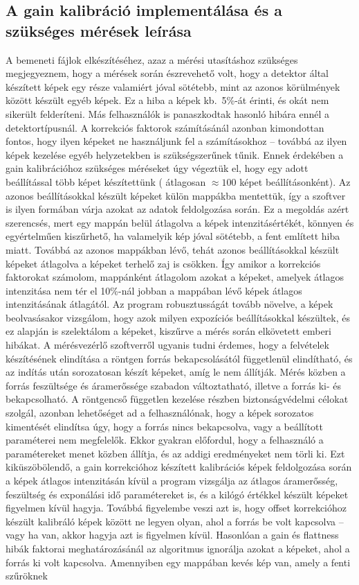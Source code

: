 \documentclass[a4paper,12pt]{article}
\begin{document}
 
\subsection{A gain kalibráció implementálása és a szükséges mérések leírása} 
\label{sec:reduce}
 
 
A bemeneti fájlok elkészítéséhez, azaz a mérési utasításhoz szükséges megjegyeznem, hogy a mérések során észrevehető volt, hogy a detektor által készített képek egy része valamiért jóval sötétebb, mint az azonos körülmények között készült egyéb képek. Ez a hiba a képek kb.\ 5\%-át érinti, és okát nem sikerült felderíteni. Más felhasználók is panaszkodtak hasonló hibára ennél a detektortípusnál. A korrekciós faktorok számításánál azonban kimondottan fontos, hogy ilyen képeket ne használjunk fel a számításokhoz -- továbbá az ilyen képek kezelése egyéb helyzetekben is szükségszerűnek tűnik. Ennek érdekében a gain kalibrációhoz szükséges méréseket úgy végeztük el, hogy egy adott beállítással több képet készítettünk ( átlagosan $\approx 100$ képet beállításonként). Az azonos beállításokkal készült képeket külön mappákba mentettük, így a szoftver is ilyen formában várja azokat az adatok feldolgozása során. Ez a megoldás azért szerencsés, mert egy mappán belül átlagolva a képek intenzitásértékét, könnyen és egyértelműen kiszűrhető, ha valamelyik kép jóval sötétebb, a fent említett hiba miatt. Továbbá az azonos mappákban lévő, tehát azonos beállításokkal készült képeket átlagolva a képeket terhelő zaj is csökken. Így amikor a korrekciós faktorokat számolom, mappánként átlagolom azokat a képeket, amelyek átlagos intenzitása nem tér el 10\%-nál jobban a mappában lévő képek átlagos intenzitásának átlagától. Az program  robusztusságát  tovább növelve, a képek beolvasásakor vizsgálom, hogy  azok milyen expozíciós beállításokkal készültek, és ez alapján is szelektálom a képeket, kiszűrve a mérés során elkövetett emberi hibákat. A mérésvezérlő szoftverről ugyanis tudni érdemes, hogy a felvételek készítésének elindítása a röntgen forrás bekapcsolásától függetlenül elindítható, és az indítás után sorozatosan készít képeket, amíg le nem állítják. Mérés közben a forrás feszültsége és áramerőssége szabadon változtatható, illetve a forrás ki- és bekapcsolható. A röntgencső független kezelése részben biztonságvédelmi célokat szolgál, azonban lehetőséget ad a felhasználónak, hogy a képek sorozatos kimentését elindítsa úgy, hogy a forrás nincs bekapcsolva, vagy a beállított paraméterei nem megfelelők. Ekkor gyakran előfordul, hogy a felhasználó a paramétereket menet közben állítja, és az addigi eredményeket nem törli ki. Ezt kiküszöbölendő, a gain korrekcióhoz készített kalibrációs képek feldolgozása során a képek átlagos intenzitásán kívül a program vizsgálja az átlagos áramerősség, feszültség és exponálási idő paramétereket is, és a kilógó értékkel készült képeket figyelmen kívül hagyja. Továbbá figyelembe veszi azt is, hogy offset korrekcióhoz készült kalibráló képek között ne legyen olyan, ahol a forrás be volt kapcsolva -- vagy ha van, akkor hagyja azt is figyelmen kívül. Hasonlóan a gain és flattness hibák faktorai meghatározásánál az algoritmus ignorálja azokat a képeket, ahol a forrás ki volt kapcsolva. Amennyiben egy mappában kevés kép van, amely a fenti szűröknek 
\end{document}
